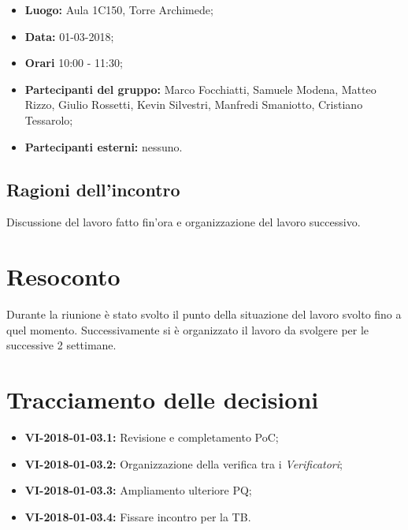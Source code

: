 \documentclass[openany,12pt,a4paper]{article}
\begin{document}
	\begin{itemize} 
	    \item \textbf{Luogo:} Aula 1C150, Torre Archimede;
	    \item \textbf{Data:} 01-03-2018;
	    \item \textbf{Orari} 10:00 - 11:30;
	    \item \textbf{Partecipanti del gruppo:} Marco Focchiatti, Samuele Modena, Matteo Rizzo, Giulio Rossetti, Kevin Silvestri, Manfredi Smaniotto, Cristiano Tessarolo;
	    \item \textbf{Partecipanti esterni:} nessuno.
	\end{itemize}
	
	\subsection{Ragioni dell'incontro}
	
	Discussione del lavoro fatto fin'ora e organizzazione del lavoro successivo.

	\section{Resoconto}
	
	Durante la riunione è stato svolto il punto della situazione del lavoro svolto fino a quel momento. Successivamente si è organizzato il lavoro da svolgere per le successive 2 settimane.  
	
	\section{Tracciamento delle decisioni}
	
	\begin{itemize}
	    \item \textbf{VI-2018-01-03.1:} Revisione e completamento PoC;
	    \item \textbf{VI-2018-01-03.2:} Organizzazione della verifica tra i \textit{Verificatori};
	    \item \textbf{VI-2018-01-03.3:} Ampliamento ulteriore PQ;
	    \item \textbf{VI-2018-01-03.4:} Fissare incontro per la TB.
	\end{itemize}	

	
\end{document}
